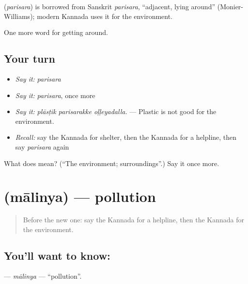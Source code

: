 \begin{cousinweb}
\textbf{} (\emph{parisara}) is borrowed from Sanskrit \emph{parisara}, \textquotedblleft{}adjacent, lying around\textquotedblright{} (Monier-Williams); modern Kannada uses it for the environment.
\end{cousinweb}

\begin{grammarlens}[title={What you've built}]
One more word for getting around.
\end{grammarlens}

\subsection*{Your turn}
\begin{itemize}
\raggedright
  \item \emph{Say it:} \emph{parisara}
  \item \emph{Say it:} \emph{parisara}, once more
  \item \emph{Say it:} \emph{plāsṭik parisarakke oḷḷeyadalla.} — Plastic is not good for the environment.
  \item \emph{Recall:} say the Kannada for shelter, then the Kannada for a helpline, then say \emph{parisara} again
\end{itemize}

\begin{tcolorbox}[breakable,colback=teal!4,colframe=teal!35!black,title={Before you move on}]
What does  mean? (\textquotedblleft{}The environment; surroundings\textquotedblright{}.) Say it once more.
\end{tcolorbox}
\section[\texorpdfstring{\kn{ಮಾಲಿನ್ಯ} (mālinya)}{ಮಾಲಿನ್ಯ (mālinya)}]{ (mālinya) — pollution}

\label{lesson:KA-C473-malinya}



\begin{quote}
Before the new one: say the Kannada for a helpline, then the Kannada for the environment.
\end{quote}

\subsection*{You'll want to know: }
\textbf{} — \emph{mālinya} — \textquotedblleft{}pollution\textquotedblright{}.

